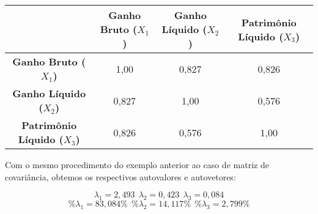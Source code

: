 \documentclass[
  openany]{book}
\begin{document}
\begin{longtable}[]{@{}cccc@{}}
\toprule
& \textbf{Ganho Bruto (\(X_1\))} & \textbf{Ganho Líquido (\(X_2\))} & \textbf{Patrimônio Líquido (\(X_3\))}\tabularnewline
\midrule
\endhead
\textbf{Ganho Bruto (\(X_1\))} & 1,00 & 0,827 & 0,826\tabularnewline
\textbf{Ganho Líquido (\(X_2\))} & 0,827 & 1,00 & 0,576\tabularnewline
\textbf{Patrimônio Líquido (\(X_3\))} & 0,826 & 0,576 & 1,00\tabularnewline
\bottomrule
\end{longtable}

Com o mesmo procedimento do exemplo anterior ao caso de matriz de covariância, obtemos os respectivos autovalores e autovetores:

\[\lambda_1=2,493 \ \ \lambda_2=0,423 \ \ \lambda_3=0,084 \]
\[\%\lambda_1=83,084\% \ \ \%\lambda_2=14,117\% \ \ \%\lambda_3=2,799\%\]
\end{document}
